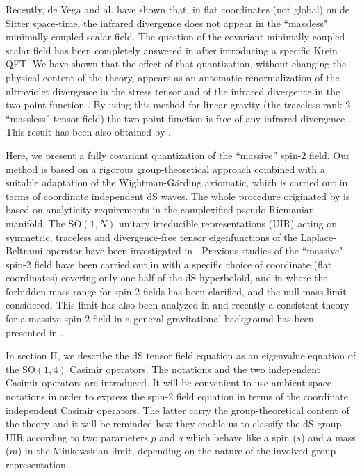 \documentclass[a4paper,11pt,showpacs,preprintnumbers]{revtex4}
\begin{document}
Recently, de Vega and al. \cite{vera} have shown that,  in flat
coordinates (not global)  on de Sitter space-time, the infrared
divergence does not appear in the ``massless" minimally coupled
scalar field. The question  of the covariant minimally coupled
scalar field has been completely answered in \cite{gareta1} after
introducing a specific Krein QFT. We have shown that the effect of
that quantization, without changing the physical content of the
theory, appears as an automatic renormalization of the ultraviolet
divergence in the stress tensor and of the infrared divergence in
the two-point function \cite{ta4}. By using this method for linear
gravity (the traceless rank-2 ``massless'' tensor field) the
two-point function is free of any infrared divergence \cite{ta}.
This result has been also obtained by \cite{hahetu, hiko1, hiko2}.

Here, we present a fully covariant quantization of the ``massive''
spin-$2$ field. Our method is based on a rigorous
group-theoretical approach combined with a suitable adaptation of
the Wightman-G\"arding axiomatic, which is carried out in terms of
coordinate independent dS waves. The whole procedure originated by
\cite{brgamo} is based on analyticity requirements in the
complexified pseudo-Riemanian manifold. The SO$(1,N)$ unitary
irreducible representations (UIR) acting on symmetric, traceless
and divergence-free tensor eigenfunctions of the Laplace-Beltrami
operator have been investigated in \cite{higu1}. Previous studies
of the ``massive" spin-2 field have been carried out in
\cite{gasp} with a specific choice of coordinate (flat
coordinates) covering only one-half of the dS hyperboloid, and in
\cite{higu2} where the forbidden mass range for spin-2 fields has
been clarified, and the null-mass limit considered. This limit has
also been analyzed in \cite{papa} and recently a consistent theory
for a massive spin-$2$ field in a general gravitational background
has been presented in \cite{bu}.

In section II, we describe the dS tensor field equation as an
eigenvalue equation of the SO$(1,4)$ Casimir operators. The
notations and the two independent Casimir operators are
introduced. It will be convenient to use ambient space notations
in order to express the spin-2 field equation in terms of the
coordinate independent Casimir operators. The latter carry the
group-theoretical content of the theory and it will be reminded
how they enable us to classify the dS group UIR \cite{dix,tak}
according to two parameters $p$ and $q$ which behave like a spin
($s$) and a mass ($m$) in the Minkowskian limit, depending on the
nature of the involved group representation.
\end{document}
